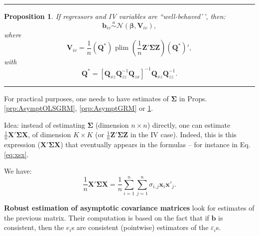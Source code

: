 \documentclass[
]{book}
\newtheorem{proposition}{Proposition}[chapter]
\theoremstyle{definition}
\theoremstyle{definition}
\theoremstyle{definition}
\theoremstyle{definition}
\theoremstyle{remark}
\begin{document}
\begin{center}\rule{0.5\linewidth}{0.5pt}\end{center}

\begin{proposition}
\protect\hypertarget{prp:AsymptIVGRM}{}\label{prp:AsymptIVGRM}If regressors and IV variables are ``well-behaved'\,', then:
\[
\mathbf{b}_{iv} \overset{a}{\sim} \mathcal{N}(\boldsymbol\beta,\mathbf{V}_{iv}),
\]
where
\[
\mathbf{V}_{iv} = \frac{1}{n}(\mathbf{Q}^*)\mbox{ plim }\left( \frac{1}{n} \mathbf{Z}'\boldsymbol\Sigma \mathbf{Z}\right)(\mathbf{Q}^*)',
\]
with
\[
\mathbf{Q}^* = [\mathbf{Q}_{xz}\mathbf{Q}_{zz}^{-1}\mathbf{Q}_{zx}]^{-1}\mathbf{Q}_{xz}\mathbf{Q}_{zz}^{-1}.
\]
\end{proposition}

\begin{center}\rule{0.5\linewidth}{0.5pt}\end{center}

For practical purposes, one needs to have estimates of \(\boldsymbol\Sigma\) in Props. \ref{prp:AsymptOLSGRM}, \ref{prp:AsymptGRM} or \ref{prp:AsymptIVGRM}.

Idea: instead of estimating \(\boldsymbol\Sigma\) (dimension \(n \times n\)) directly, one can estimate \(\frac{1}{n}\mathbf{X}'\boldsymbol\Sigma\mathbf{X}\), of dimension \(K \times K\) (or \(\frac{1}{n}\mathbf{Z}'\boldsymbol\Sigma\mathbf{Z}\) in the IV case). Indeed, this is this expression (\(\mathbf{X}'\boldsymbol\Sigma\mathbf{X}\)) that eventually appears in the formulas -- for instance in Eq. \eqref{eq:xsx}.

We have:
\begin{equation}
\frac{1}{n}\mathbf{X}'\boldsymbol\Sigma\mathbf{X} = \frac{1}{n}\sum_{i=1}^{n}\sum_{j=1}^{n}\sigma_{i,j}\mathbf{x}_i\mathbf{x}'_j. \label{eq:GeneralXSigmaX}
\end{equation}

\textbf{Robust estimation of asymptotic covariance matrices} look for estimates of the previous matrix. Their computation is based on the fact that if \(\mathbf{b}\) is consistent, then the \(e_i\)s are consistent (pointwise) estimators of the \(\varepsilon_i\)s.
\end{document}
